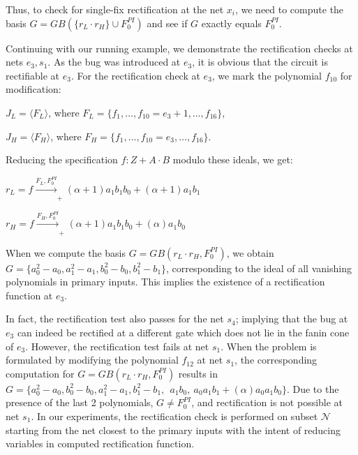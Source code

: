 Thus, to check for single-fix rectification at the net $x_i$, we need
to compute the \Grobner basis $G = GB(\{r_L\cdot r_H\}\cup F_{0}^{PI})$
and see if $G$ exactly equals $F_{0}^{PI}$.  

\begin{Example}
\label{ex:3}
Continuing with our running example, we demonstrate the rectification
checks at nets $e_3, s_1$. As the bug was introduced at $e_3$, it is
obvious that the circuit is rectifiable at $e_3$. For the
rectification check at $e_3$, we mark the polynomial $f_{10}$ for
modification:

\bi
\item $J_L = \langle F_L\rangle$, where $F_L=\{f_1,\dots, f_{10}=e_3+1,\dots, f_{16}\}$,
\item $J_H = \langle F_H\rangle$, where $F_H = \{f_1,\dots, f_{10}=e_3,\dots, f_{16}\}$.
\ei

Reducing the specification $f: Z+A\cdot B$ modulo these ideals, we get:
\bi
\item $r_L = f \xrightarrow[]{F_L, F_{0}^{PI}}_+{(\alpha+1)a_1b_1b_0+(\alpha+1)a_1b_1}$
\item $r_H = f \xrightarrow[]{F_H,F_{0}^{PI}}_+{(\alpha+1)a_1b_1b_0+(\alpha)a_1b_0}$
\ei
  
When we compute the \Grobner basis $G = GB(r_L\cdot r_H, F_{0}^{PI})$,
we obtain $G = \{a_0^2-a_0, a_1^2-a_1,b_0^2-b_0,b_1^2-b_1\}$,
corresponding to the ideal of all vanishing polynomials in primary
inputs. This implies the existence of a rectification function at
$e_3$. 

In fact, the rectification test also passes for the net $s_4$;
implying that the bug at $e_3$ can indeed be rectified at a different
gate which does not lie in the fanin cone of $e_3$. However, the
rectification test fails at net $s_1$. When the problem is formulated by 
modifying the polynomial $f_{12}$ at net $s_1$, the corresponding
computation for $G = GB(r_L\cdot r_H, F_{0}^{PI})$ results in
$G=\{a_0^2-a_0,b_0^2-b_0,a_1^2-a_1,b_1^2-b_1, ~~a_1b_0, ~a_0a_1b_1 +
(\alpha)a_0a_1b_0\}$. Due to the presence of the last 2 polynomials, 
$G \neq F_0^{PI}$, and rectification is not possible at net $s_1$. 
In our experiments, the rectification check is performed
on subset $\mathcal{N}$ starting from the net closest to the primary inputs
with the intent of reducing variables in computed rectification function. 
\end{Example}
